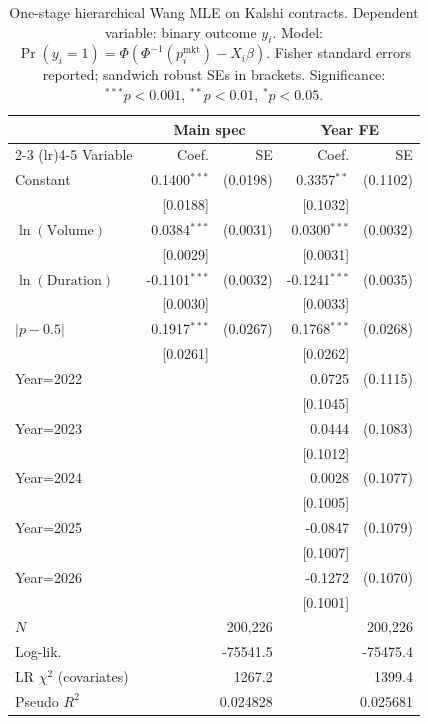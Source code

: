 \begin{table}[H]
\centering
\small
\caption{One-stage hierarchical Wang MLE on Kalshi contracts. Dependent variable: binary outcome $y_i$. Model: $\Pr(y_i = 1) = \Phi(\Phi^{-1}(p_i^{\text{mkt}}) - X_i\beta)$. Fisher standard errors reported; sandwich robust SEs in brackets. Significance: $^{***}p<0.001$, $^{**}p<0.01$, $^{*}p<0.05$.}
\label{tab:kalshi_hierarchical}
\begin{tabular}{lrrrr}
\toprule
 & \multicolumn{2}{c}{Main spec} & \multicolumn{2}{c}{Year FE} \\
\cmidrule(lr){2-3} \cmidrule(lr){4-5}
Variable & Coef. & SE & Coef. & SE \\
\midrule
Constant & 0.1400$^{***}$ & (0.0198) & 0.3357$^{**}$ & (0.1102) \\
 & [0.0188] & & [0.1032] & \\
$\ln(\text{Volume})$ & 0.0384$^{***}$ & (0.0031) & 0.0300$^{***}$ & (0.0032) \\
 & [0.0029] & & [0.0031] & \\
$\ln(\text{Duration})$ & -0.1101$^{***}$ & (0.0032) & -0.1241$^{***}$ & (0.0035) \\
 & [0.0030] & & [0.0033] & \\
$|p - 0.5|$ & 0.1917$^{***}$ & (0.0267) & 0.1768$^{***}$ & (0.0268) \\
 & [0.0261] & & [0.0262] & \\
Year=2022 & & & 0.0725 & (0.1115) \\
 & & & [0.1045] & \\
Year=2023 & & & 0.0444 & (0.1083) \\
 & & & [0.1012] & \\
Year=2024 & & & 0.0028 & (0.1077) \\
 & & & [0.1005] & \\
Year=2025 & & & -0.0847 & (0.1079) \\
 & & & [0.1007] & \\
Year=2026 & & & -0.1272 & (0.1070) \\
 & & & [0.1001] & \\
\midrule
$N$ & \multicolumn{2}{r}{200,226} & \multicolumn{2}{r}{200,226} \\
Log-lik. & \multicolumn{2}{r}{-75541.5} & \multicolumn{2}{r}{-75475.4} \\
LR $\chi^2$ (covariates) & \multicolumn{2}{r}{1267.2} & \multicolumn{2}{r}{1399.4} \\
Pseudo $R^2$ & \multicolumn{2}{r}{0.024828} & \multicolumn{2}{r}{0.025681} \\
\bottomrule
\end{tabular}
\end{table}